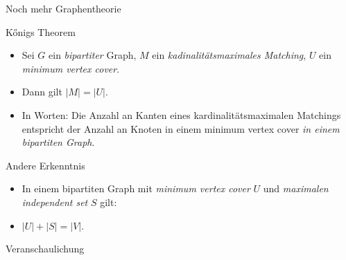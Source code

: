 \documentclass[18pt]{beamer}
\begin{document}
\begin{frame}{Noch mehr Graphentheorie}
\begin{block}{Kőnigs Theorem }
\begin{itemize}
\item Sei $G$ ein \textit{bipartiter} Graph, $M$ ein \textit{kadinalit\"atsmaximales Matching}, $U$ ein \textit{minimum vertex cover}.
\item Dann gilt $|M| = |U|$.
\item In Worten: Die Anzahl an Kanten eines kardinalit\"atsmaximalen Matchings entspricht der Anzahl an Knoten in einem minimum vertex cover
\textit{in einem bipartiten Graph}.
\end{itemize}
\end{block}

\pause

\begin{block}{Andere Erkenntnis}
\begin{itemize}
\item In einem bipartiten Graph mit \textit{minimum vertex cover} $U$ und \textit{maximalen independent set} $S$ gilt:
\item $|U| + |S| = |V|$.
\end{itemize}
\end{block}
\end{frame}

\begin{frame}{Veranschaulichung}
\begin{center}
\end{center}
\end{frame}
\end{document}
